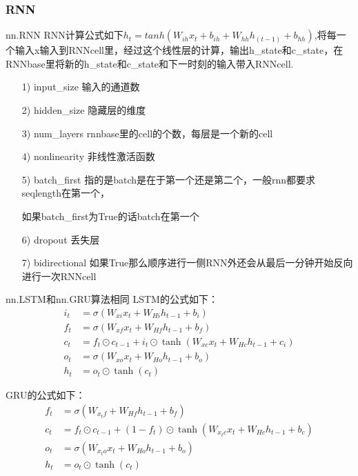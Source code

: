 \documentclass[11pt]{ctexart}
\begin{document}
\subsubsection{RNN}
nn.RNN
RNN计算公式如下$h_t = tanh(W_{ih} x_t +b_{ih} +W_{hh}h_{(t-1)} +b_{hh})$,将每一个输入x输入到RNNcell里，经过这个线性层的计算，输出h\_state和c\_state，在RNNbase里将新的h\_state和c\_state和下一时刻的输入带入RNNcell.
\begin{itemize}
  \item [1)]
  input\_size 输入的通道数
  \item [2)]
  hidden\_size 隐藏层的维度
  \item [3)]
  num\_layers rnnbase里的cell的个数，每层是一个新的cell
  \item [4)]
  nonlinearity 非线性激活函数
  \item [5)]
  batch\_first 指的是batch是在于第一个还是第二个，一般rnn都要求seqlength在第一个，\par 如果batch\_first为True的话batch在第一个
  \item [6)]
  dropout 丢失层
  \item [7)]
  bidirectional 如果True那么顺序进行一侧RNN外还会从最后一分钟开始反向进行一次RNNcell

\end{itemize}

nn.LSTM和nn.GRU算法相同
LSTM的公式如下：
\begin{equation}
\begin{split}
    i_t &= \sigma (W_{x i} x_t + W_{H i} h_{t-1} + b_i)\\
    f_t &= \sigma (W_{x f} x_t + W_{H f} h_{t-1} + b_f)\\
    c_t &= f_t \odot c_{t-1} + i_t \odot \tanh (W_{x c} x_t + W_{H c} h_{t-1} + c_i)\\
    o_t &= \sigma (W_{x o} x_t + W_{H o} h_{t-1} + b_o)\\
    h_t &= o_t \odot \tanh(c_t)
\end{split}
\end{equation}

GRU的公式如下：
\begin{equation}
\begin{split}
    f_t &= \sigma (W_{x_t f} +W_{H f} h_{t-1} + b_f)\\
    c_t &= f_t \odot c_{t-1} + (1-f_t) \odot \tanh (W_{x_t c} x_t +W_{H c} h_{t-1} + b_c)\\
    o_t &= \sigma (W_{x_t o} x_t +W_{H o} h_{t-1} + b_o)\\
    h_t &= o_t \odot \tanh(c_t)
\end{split}
\end{equation}
\end{document}
